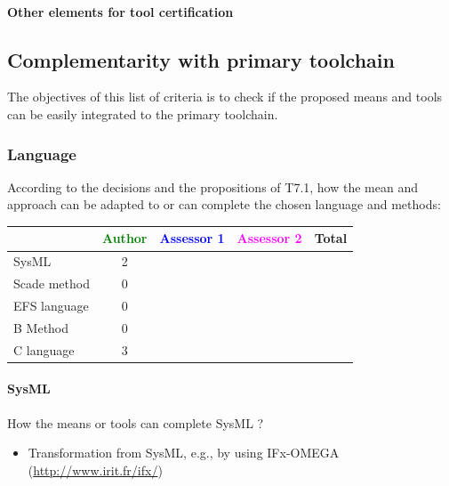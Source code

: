 	

\paragraph{Other elements for tool certification}


\subsection{Complementarity with primary toolchain}

The objectives of this list of criteria is to check if the proposed means and tools can be easily integrated to the primary toolchain.

\subsubsection{Language}


According to the decisions and the propositions of T7.1, how the mean and approach can be adapted to or can complete the chosen language and methods:

\begin{tabular}{|l | c | c | c | c|}
\hline
& \textcolor{green}{Author} & \textcolor{blue}{Assessor 1} & \textcolor{magenta}{Assessor 2} & Total \\
\hline 
SysML  & 2 & & & \\
\hline
Scade method & 0 & & & \\
\hline
EFS language & 0 & & & \\
\hline
B Method & 0 & & & \\
\hline
C language & 3 & & & \\
\hline
\end{tabular}

\paragraph{SysML}
How the means or tools can complete SysML ?

\begin{author_comment}
	\begin{itemize}
		\item Transformation from SysML, e.g., by using IFx-OMEGA (\url{http://www.irit.fr/ifx/})
	\end{itemize}
\end{author_comment}

